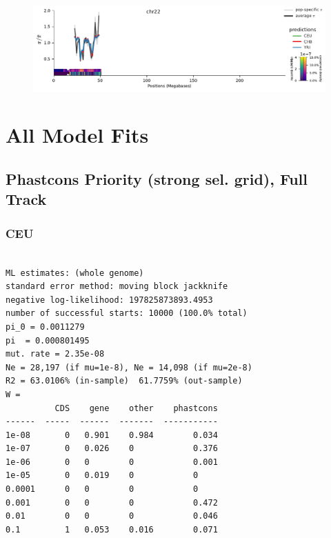 \documentclass[11pt]{article}
\begin{document}
\begin{figure}[!htb]
  \centering
  \includegraphics[width=\textwidth]{figures/supplementary/pred_plot_chr22.pdf}
  \label{suppfig:fit-chr22}
\end{figure}

\clearpage

\section{All Model Fits}
\label{supp:fits}



\subsection{Phastcons Priority (strong sel. grid), Full Track}
\subsubsection*{CEU}
\begin{minipage}{\linewidth}\begin{footnotesize}
\begin{verbatim}

ML estimates: (whole genome)
standard error method: moving block jackknife
negative log-likelihood: 197825873893.4953
number of successful starts: 10000 (100.0% total)
pi_0 = 0.0011279
pi  = 0.000801495
mut. rate = 2.35e-08 
Ne = 28,197 (if mu=1e-8), Ne = 14,098 (if mu=2e-8)
R2 = 63.0106% (in-sample)  61.7759% (out-sample)
W = 
          CDS    gene    other    phastcons
------  -----  ------  -------  -----------
1e-08       0   0.901    0.984        0.034
1e-07       0   0.026    0            0.376
1e-06       0   0        0            0.001
1e-05       0   0.019    0            0
0.0001      0   0        0            0
0.001       0   0        0            0.472
0.01        0   0        0            0.046
0.1         1   0.053    0.016        0.071
\end{verbatim}
\end{footnotesize}\end{minipage}
\end{document}
